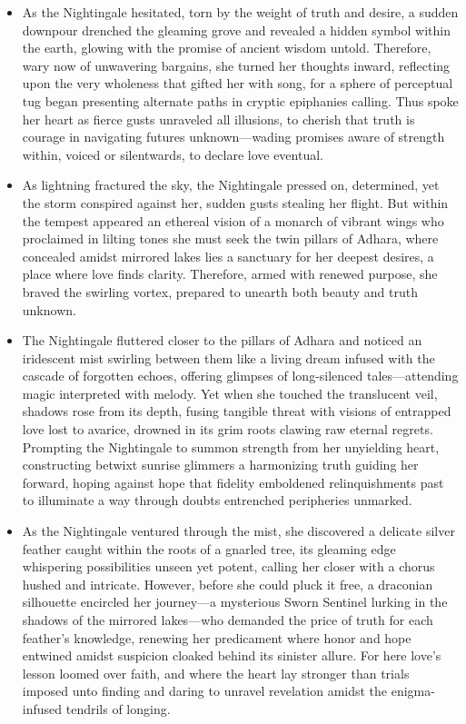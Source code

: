 \documentclass[11pt]{article}
\begin{document}
\begin{small}
\begin{itemize}
    \item As the Nightingale hesitated, torn by the weight of truth and desire, a sudden downpour drenched 
    the gleaming grove and revealed a hidden symbol within the earth, glowing with the promise of ancient 
    wisdom untold. Therefore, wary now of unwavering bargains, she turned her thoughts inward, reflecting 
    upon the very wholeness that gifted her with song, for a sphere of perceptual tug began presenting 
    alternate paths in cryptic epiphanies calling. Thus spoke her heart as fierce gusts unraveled all 
    illusions, to cherish that truth is courage in navigating futures unknown—wading promises aware of 
    strength within, voiced or silentwards, to declare love eventual.

    \item As lightning fractured the sky, the Nightingale pressed on, determined, yet the storm conspired 
    against her, sudden gusts stealing her flight. But within the tempest appeared an ethereal vision of a 
    monarch of vibrant wings who proclaimed in lilting tones she must seek the twin pillars of Adhara, where 
    concealed amidst mirrored lakes lies a sanctuary for her deepest desires, a place where love finds 
    clarity. Therefore, armed with renewed purpose, she braved the swirling vortex, prepared to unearth both 
    beauty and truth unknown.

    \item The Nightingale fluttered closer to the pillars of Adhara and noticed an iridescent mist swirling 
    between them like a living dream infused with the cascade of forgotten echoes, offering glimpses of 
    long-silenced tales—attending magic interpreted with melody. Yet when she touched the translucent veil, 
    shadows rose from its depth, fusing tangible threat with visions of entrapped love lost to avarice, 
    drowned in its grim roots clawing raw eternal regrets. Prompting the Nightingale to summon strength 
    from her unyielding heart, constructing betwixt sunrise glimmers a harmonizing truth guiding her forward, 
    hoping against hope that fidelity emboldened relinquishments past to illuminate a way through doubts 
    entrenched peripheries unmarked.

    \item As the Nightingale ventured through the mist, she discovered a delicate silver feather caught 
    within the roots of a gnarled tree, its gleaming edge whispering possibilities unseen yet potent, 
    calling her closer with a chorus hushed and intricate. However, before she could pluck it free, a 
    draconian silhouette encircled her journey—a mysterious Sworn Sentinel lurking in the shadows of the 
    mirrored lakes—who demanded the price of truth for each feather's knowledge, renewing her predicament 
    where honor and hope entwined amidst suspicion cloaked behind its sinister allure. For here love's 
    lesson loomed over faith, and where the heart lay stronger than trials imposed unto finding and daring 
    to unravel revelation amidst the enigma-infused tendrils of longing.


\end{itemize}
\end{small}
\end{document}
